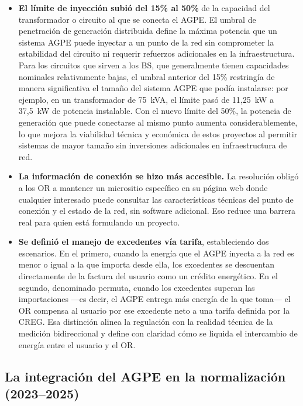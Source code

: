 \begin{itemize}
    \item \textbf{El límite de inyección subió del 15\% al 50\%} de la capacidad del transformador o circuito al que se conecta el AGPE. El umbral de penetración de generación distribuida define la máxima potencia que un sistema AGPE puede inyectar a un punto de la red sin comprometer la estabilidad del circuito ni requerir refuerzos adicionales en la infraestructura. Para los circuitos que sirven a los BS, que generalmente tienen capacidades nominales relativamente bajas, el umbral anterior del 15\% restringía de manera significativa el tamaño del sistema AGPE que podía instalarse: por ejemplo, en un transformador de 75~kVA, el límite pasó de 11,25~kW a 37,5~kW de potencia instalable. Con el nuevo límite del 50\%, la potencia de generación que puede conectarse al mismo punto aumenta considerablemente, lo que mejora la viabilidad técnica y económica de estos proyectos al permitir sistemas de mayor tamaño sin inversiones adicionales en infraestructura de red.

    \item \textbf{La información de conexión se hizo más accesible.} La resolución obligó a los OR a mantener un micrositio específico en su página web donde cualquier interesado puede consultar las características técnicas del punto de conexión y el estado de la red, sin software adicional. Eso reduce una barrera real para quien está formulando un proyecto.

    \item \textbf{Se definió el manejo de excedentes vía tarifa}, estableciendo dos escenarios. En el primero, cuando la energía que el AGPE inyecta a la red es menor o igual a la que importa desde ella, los excedentes se descuentan directamente de la factura del usuario como un crédito energético. En el segundo, denominado permuta, cuando los excedentes superan las importaciones —es decir, el AGPE entrega más energía de la que toma— el OR compensa al usuario por ese excedente neto a una tarifa definida por la CREG. Esa distinción alinea la regulación con la realidad técnica de la medición bidireccional y define con claridad cómo se liquida el intercambio de energía entre el usuario y el OR.
\end{itemize}

\subsection{La integración del AGPE en la normalización (2023--2025)}
\label{subsec:integracion_agpe_normalizacion}

